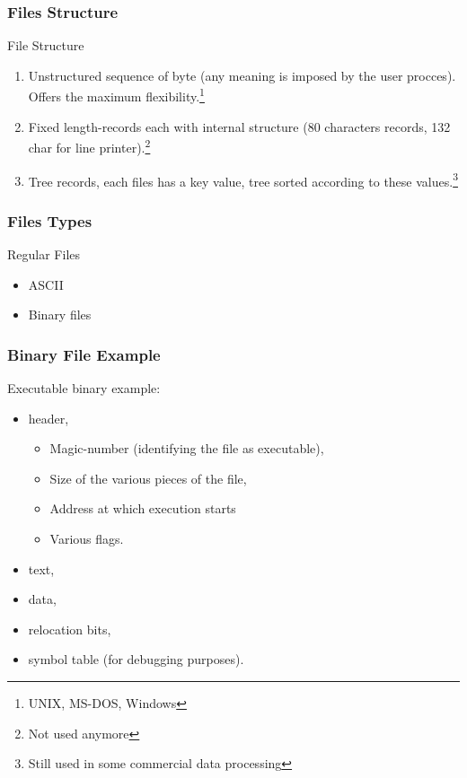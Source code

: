 \begin{frame}
  \frametitle{Files Structure}
  \begin{block}{File Structure}
    \begin{enumerate}
      \item Unstructured sequence of byte (any meaning is imposed by the user procces). Offers the maximum flexibility.\footnote{UNIX, MS-DOS, Windows}
      \item Fixed length-records each with internal structure (80 characters records, 132 char for line printer).\footnote{Not used anymore}
      \item Tree records, each files has a key value, tree sorted according to these values.\footnote{Still used in some commercial data processing}
    \end{enumerate}
  \end{block}
\end{frame}

\begin{frame}
  \frametitle{Files Types}
  \begin{block}{Regular Files}
    \begin{itemize}
      \item ASCII
      \item Binary files
    \end{itemize}
  \end{block}
\end{frame}

\begin{frame}
  \frametitle{Binary File Example}
  \begin{block}{Executable binary example:}
    \begin{itemize}
      \item header,
      \begin{itemize}
          \item Magic-number (identifying the file as executable),
          \item Size of the various pieces of the file,
          \item Address at which execution starts
          \item Various flags.
      \end{itemize}
      \item text,
      \item data,
      \item relocation bits,
      \item symbol table (for debugging purposes).
    \end{itemize}
  \end{block}
\end{frame}

